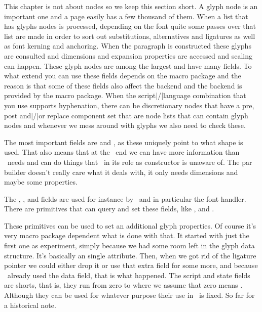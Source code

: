\stopsubsection

\stopsection

\startsection[title={Nodes}]

This chapter is not about nodes so we keep this section short. A glyph node is an
important one and a page easily has a few thousand of them. When a list that has
glyphs nodes is processed, depending on the font quite some passes over that list
are made in order to sort out substitutions, alternatives and ligatures as well
as font kerning and anchoring. When the paragraph is constructed these glyphs are
consulted and dimensions and expansion properties are accessed and scaling can
happen. These glyph nodes are among the largest and have many fields. To what
extend you can use these fields depends on the macro package and the reason is
that some of these fields also affect the backend and the backend is provided by
the macro package. When the script|/|language combination that you use supports
hyphenation, there can be discretionary nodes that have a pre, post and|/|or
replace component set that are node lists that can contain glyph nodes and
whenever we mess around with glyphs we also need to check these.

The most important fields are  and , as these
uniquely point to what shape is used. That also means that at the \LUA\ end we
can have more information than \TEX\ needs and can do things that \TEX\ in its
role as constructor is unaware of. The par builder doesn't really care what it
deals with, it only needs dimensions and maybe some properties.

The , ,  and  fields are
used for instance by \CONTEXT\ and in particular the font handler. There are
primitives that can query and set these fields, like \typ {\glyphdatafield}, \typ
{\glyphscriptfield} and \typ {\glyphstatefield}.

These primitives can be used to set an additional glyph properties. Of course
it's very macro package dependent what is done with that. It started with just
the first one as experiment, simply because we had some room left in the glyph
data structure. It's basically an single attribute. Then, when we got rid of the
ligature pointer we could either drop it or use that extra field for some more,
and because \CONTEXT\ already used the data field, that is what happened. The
script and state fields are shorts, that is, they run from zero to 
where we assume that zero means . Although they can be used for
whatever purpose their use in \CONTEXT\ is fixed. So far for a historical note.

